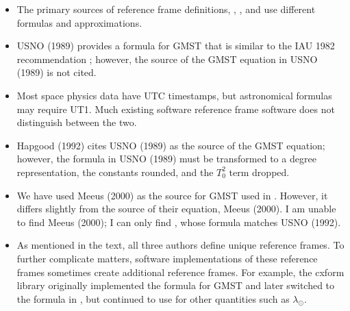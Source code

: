 \documentclass[11pt]{article}
\begin{document}
{\begin{leftbar}
\begin{itemize}


\item The primary sources of reference frame definitions, \cite{Russell1971}, \cite{Hapgood1992}, and \cite{Franz2002} use different formulas and approximations.

\item USNO (1989) provides a formula for GMST that is similar to the IAU 1982 recommendation \citep{Aoki1982}; however, the source of the GMST equation in USNO (1989) is not cited.

\item Most space physics data have UTC timestamps, but astronomical formulas may require UT1. Much existing software reference frame software does not distinguish between the two.

\item Hapgood (1992) cites USNO (1989) as the source of the GMST equation; however, the formula in USNO (1989) must be transformed to a degree representation, the constants rounded, and the $T_0^2$ term dropped.  

\item We have used Meeus (2000) as the source for GMST used in \cite{Franz2002}. However, it differs slightly from the source of their equation, Meeus (2000). I am unable to find Meeus (2000); I can only find \cite{Meeus1998}, whose formula matches USNO (1992).

\item As mentioned in the text, all three authors define unique reference frames. To further complicate matters, software implementations of these reference frames sometimes create additional reference frames. For example, the cxform library originally implemented the \citet{Hapgood1992} formula for GMST and later switched to the formula in \citet{Franz2002}, but continued to use \citet{Hapgood1992} for other quantities such as $\lambda_{\odot}$.

\end{itemize}
\fi
\end{leftbar}
}
\end{document}

